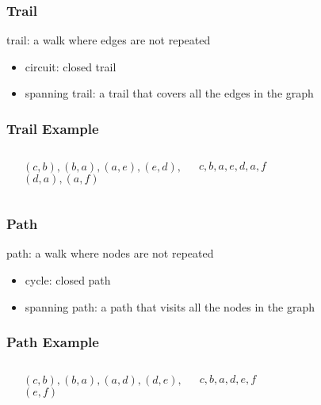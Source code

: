 \documentclass[dvipsnames]{beamer}
\begin{document}
\begin{frame}
  \frametitle{Trail}

  \begin{definition}
    \alert{trail}: a walk where edges are not repeated
  \end{definition}

  \pause
  \begin{itemize}
    \item \alert{circuit}: closed trail
    \item \alert{spanning} trail: a trail that covers all the edges in the
      graph
  \end{itemize}
\end{frame}

\begin{frame}
  \frametitle{Trail Example}

  \begin{example}
    \begin{columns}
      \begin{center}
      \end{center}

      $(c,b),(b,a),(a,e),(e,d),$\\
      $(d,a),(a,f)$

      \medskip
      $c,b,a,e,d,a,f$
    \end{columns}
  \end{example}
\end{frame}

\begin{frame}
  \frametitle{Path}

  \begin{definition}
    \alert{path}: a walk where nodes are not repeated
  \end{definition}

  \pause
  \begin{itemize}
    \item \alert{cycle}: closed path
    \item \alert{spanning} path: a path that visits all the nodes in the graph
  \end{itemize}
\end{frame}

\begin{frame}
  \frametitle{Path Example}

  \begin{example}
    \begin{columns}
      \begin{center}
      \end{center}

      $(c,b),(b,a),(a,d),(d,e),$\\
      $(e,f)$

      \medskip
      $c,b,a,d,e,f$
    \end{columns}
  \end{example}
\end{frame}
\end{document}
